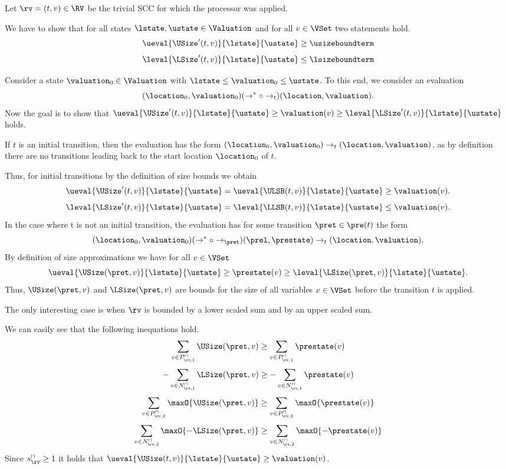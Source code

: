 Let $\rv = (t, v) \in \RV$ be the trivial SCC for which the processor was applied.

We have to show that for all states $\lstate, \ustate \in \Valuation$ and for all $v \in \VSet$ two statements hold.
\[ \ueval{\USize'(t, v)}{\lstate}{\ustate} \geq \usizeboundterm \]
\[ \leval{\LSize'(t, v)}{\lstate}{\ustate} \leq \lsizeboundterm \]

Consider a state $\valuation_0 \in \Valuation$ with $\lstate \leq \valuation_0 \leq \ustate$.
To this end, we consider an evaluation
\[ (\location_0, \valuation_0) (\rightarrow^* \circ \rightarrow_t) (\location, \valuation). \]
Now the goal is to show that $\ueval{\USize'(t, v)}{\lstate}{\ustate} \geq \valuation(v) \geq \leval{\LSize'(t, v)}{\lstate}{\ustate}$ holds.

If $t$ is an initial transition, then the evaluation has the form $(\location_0, \valuation_0) \rightarrow_t (\location, \valuation)$, as by definition there are no transitions leading back to the start location $\location_0$ of $t$.

Thus, for initial transitions by the definition of size bounds we obtain
\[ \ueval{\USize'(t, v)}{\lstate}{\ustate} = \ueval{\ULSB(t, v)}{\lstate}{\ustate} \geq \valuation(v). \]
\[ \leval{\LSize'(t, v)}{\lstate}{\ustate} = \leval{\LLSB(t, v)}{\lstate}{\ustate} \leq \valuation(v). \]
In the case where t is not an initial transition, the evaluation has for some transition $\pret \in \pre(t)$ the form
\[ (\location_0, \valuation_0) (\rightarrow^* \circ \rightarrow_\pret) (\prel, \prestate) \rightarrow_t (\location, \valuation). \]
By definition of size approximations we have for all $v \in \VSet$
\[ \ueval{\USize(\pret, v)}{\lstate}{\ustate} \geq \prestate(v) \geq \leval{\LSize(\pret, v)}{\lstate}{\ustate}. \]
Thus, $\USize(\pret, v)$ and $\LSize(\pret, v)$ are bounds for the size of all variables $v \in \VSet$ before the transition $t$ is applied.

The only interesting case is when $\rv$ is bounded by a lower scaled sum and by an upper scaled sum.

We can easily see that the following inequations hold.
\[ \sum_{v \in P_{\rv,1}^\sqcap} \USize(\pret, v) \geq \sum_{v \in P_{\rv,1}^\sqcap} \prestate(v) \]
\[ - \sum_{v \in N_{\rv,1}^\sqcap} \LSize(\pret, v) \geq - \sum_{v \in N_{\rv,1}^\sqcap} \prestate(v) \]
\[ \sum_{v \in P_{\rv,2}^\sqcap} \maxO{\USize(\pret, v)} \geq \sum_{v \in P_{\rv,2}^\sqcap} \maxO{\prestate(v)} \]
\[ \sum_{v \in N_{\rv,2}^\sqcap} \maxO{-\LSize(\pret, v)} \geq \sum_{v \in N_{\rv,2}^\sqcap} \maxO{-\prestate(v)} \]
Since $s^\sqcap_\rv \geq 1$ it holds that $\ueval{\USize(t, v)}{\lstate}{\ustate} \geq \valuation(v)$.

